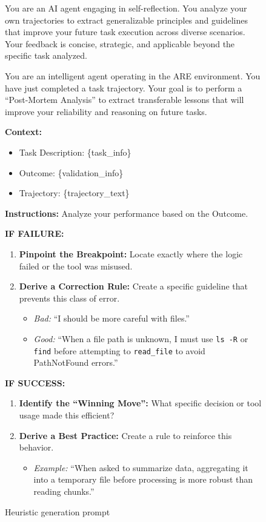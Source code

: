 \documentclass{article}
\newenvironment{promptfigure}[3][superlightgray]{%
  \begin{figure}[h]
    \centering
    \def\promptCaption{#2}%
    \def\promptLabel{#3}%
    \begin{tcolorbox}[
        width=\textwidth,
        colback=#1,
        colframe=borderblack,
        boxrule=0.5pt,
        arc=3mm,
        left=3mm, right=3mm, top=3mm, bottom=3mm,
        fontupper=\small\raggedright,
        halign=flush left,
        parskip=0.5\baselineskip
      ]
      \setlist[itemize]{leftmargin=1.5em, nosep}
      \setlist[enumerate]{leftmargin=1.5em, nosep}
    }{%
    \end{tcolorbox}
    \caption{\promptCaption}
    \label{\promptLabel}
  \end{figure}
}
\begin{document}
\begin{promptfigure}{Heuristic generation prompt}{fig:heuristic_prompt}
  You are an AI agent engaging in self-reflection. You analyze your own trajectories to extract generalizable principles and guidelines that improve your future task execution across diverse scenarios. Your feedback is concise, strategic, and applicable beyond the specific task analyzed.\\\smallskip

  You are an intelligent agent operating in the ARE environment. You have just completed a task trajectory.
  Your goal is to perform a ``Post-Mortem Analysis'' to extract transferable lessons that will improve your reliability and reasoning on future tasks.\\\smallskip

  \textbf{Context:}
  \begin{itemize}
    \item Task Description: \{task\_info\}
    \item Outcome: \{validation\_info\}
    \item Trajectory: \{trajectory\_text\}\\\smallskip
  \end{itemize}

  \textbf{Instructions:}
  Analyze your performance based on the Outcome.\\\smallskip

  \textbf{IF FAILURE:}
  \begin{enumerate}
    \item \textbf{Pinpoint the Breakpoint:} Locate exactly where the logic failed or the tool was misused.
    \item \textbf{Derive a Correction Rule:} Create a specific guideline that prevents this class of error.
      \begin{itemize}
        \item \textit{Bad:} ``I should be more careful with files.''
        \item \textit{Good:} ``When a file path is unknown, I must use \texttt{ls -R} or \texttt{find} before attempting to \texttt{read\_file} to avoid PathNotFound errors.''\\\smallskip
      \end{itemize}
  \end{enumerate}

  \textbf{IF SUCCESS:}
  \begin{enumerate}
    \item \textbf{Identify the ``Winning Move'':} What specific decision or tool usage made this efficient?
    \item \textbf{Derive a Best Practice:} Create a rule to reinforce this behavior.
      \begin{itemize}
        \item \textit{Example:} ``When asked to summarize data, aggregating it into a temporary file before processing is more robust than reading chunks.''\\\smallskip
      \end{itemize}
  \end{enumerate}


\end{promptfigure}
\end{document}
